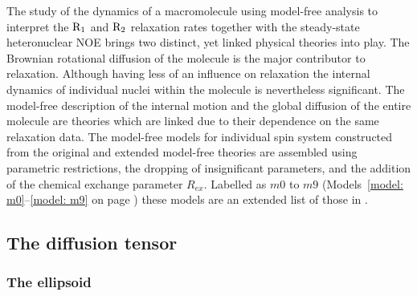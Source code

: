 \begin{htmlonly}
\begin{htmlonly}
The study of the dynamics of a macromolecule using model-free analysis to interpret the $\mathrm{R}_1$ and $\mathrm{R}_2$ relaxation rates together with the steady-state heteronuclear NOE brings two distinct, yet linked physical theories into play.  The Brownian rotational diffusion of the molecule is the major contributor to relaxation.  Although having less of an influence on relaxation the internal dynamics of individual nuclei within the molecule is nevertheless significant.  The model-free description of the internal motion and the global diffusion of the entire molecule are theories which are linked due to their dependence on the same relaxation data.  The model-free models for individual spin system constructed from the original and extended model-free theories \citep{LipariSzabo82a, LipariSzabo82b, Clore90a} are assembled using parametric restrictions, the dropping of insignificant parameters, and the addition of the chemical exchange parameter $R_{ex}$.  Labelled as $m0$ to $m9$ (Models~\ref{model: m0}--\ref{model: m9} on page \pageref{model: m9}) these models are an extended list of those in \citep{Fushman97, Orekhov99b, Korzhnev01, Zhuravleva04}.




\subsection{The diffusion tensor}


\subsubsection{The ellipsoid}


\end{htmlonly}
\end{htmlonly}
